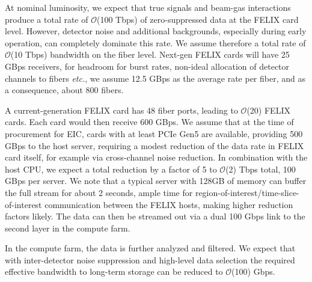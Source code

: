 At nominal luminosity, we expect that true signals and beam-gas interactions produce a total rate of $\mathcal{O}$(100 Tbps) of zero-suppressed data at the FELIX card level. However, detector noise and additional backgrounds, especially during early operation, can completely dominate this rate. We assume therefore a total rate of $\mathcal{O}$(10 Tbps) bandwidth on the fiber level. Next-gen FELIX cards will have 25 GBps receivers, for headroom for burst rates, non-ideal allocation of detector channels to fibers \emph{etc.}, we assume 12.5 GBps as the average rate per fiber, and as a consequence, about 800 fibers.

A current-generation FELIX card has 48 fiber ports, leading to $\mathcal{O}$(20) FELIX cards. Each card would then receive 600 GBps. We assume that at the time of procurement for EIC, cards with at least PCIe Gen5 are available, providing 500 GBps to the host server, requiring a modest reduction of the data rate in FELIX card itself, for example via cross-channel noise reduction. In combination with the host CPU, we expect a total reduction by a factor of 5 to $\mathcal{O}$(2) Tbps total, 100 GBps per server. We note that a typical server with 128GB of memory can buffer the full stream for about 2 seconds, ample time for region-of-interest/time-slice-of-interest communication between the FELIX hosts, making higher reduction factors likely. The data can then be streamed out via a dual 100 Gbps link to the second layer in the compute farm.

In the compute farm, the data is further analyzed and filtered. We expect that with inter-detector noise suppression and high-level data selection the required effective bandwidth to long-term storage can be reduced to $\mathcal{O}$(100) Gbps.  






